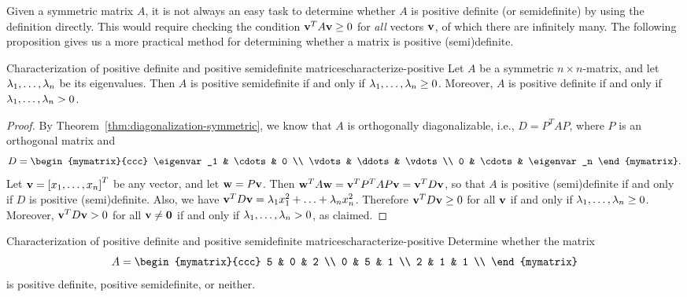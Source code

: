 Given a symmetric matrix $A$, it is not always an easy task to
determine whether $A$ is positive definite (or semidefinite) by using
the definition directly. This would require checking the condition
$\vect{v}^TA\vect{v}\geq 0$ for {\em all} vectors $\vect{v}$, of which
there are infinitely many. The following proposition gives us a more
practical method for determining whether a matrix is positive
(semi)definite.

\begin{proposition}{Characterization of positive definite and positive semidefinite matrices}{characterize-positive}
  Let $A$ be a symmetric $n\times n$-matrix, and let
  $\lambda_1,\ldots,\lambda_n$ be its eigenvalues. Then $A$ is
  positive semidefinite if and only if
  $\lambda_1,\ldots,\lambda_n\geq 0$. Moreover, $A$ is positive
  definite if and only if $\lambda_1,\ldots,\lambda_n>0$.
\end{proposition}

\begin{proof}
  By Theorem~\ref{thm:diagonalization-symmetric}, we know that $A$ is
  orthogonally diagonalizable, i.e., $D=P^TAP$, where $P$ is an
  orthogonal matrix and
  \begin{equation*}
    D = \begin{mymatrix}{ccc}
      \eigenvar_1 & \cdots & 0 \\
      \vdots & \ddots & \vdots \\
      0 & \cdots & \eigenvar_n
    \end{mymatrix}.
  \end{equation*}
  Let $\vect{v}=\mat{x_1,\ldots,x_n}^T$ be any vector, and let
  $\vect{w}=P\vect{v}$. Then
  $\vect{w}^TA\vect{w} = \vect{v}^TP^TAP\vect{v} =
  \vect{v}^TD\vect{v}$, so that $A$ is positive (semi)definite if and
  only if $D$ is positive (semi)definite. Also, we have
  $\vect{v}^TD\vect{v} = \eigenvar_1x_1^2 + \ldots +
  \eigenvar_nx_n^2$. Therefore $\vect{v}^TD\vect{v}\geq 0$ for all
  $\vect{v}$ if and only if $\lambda_1,\ldots,\lambda_n\geq
  0$. Moreover, $\vect{v}^TD\vect{v}>0$ for all
  $\vect{v}\neq \vect{0}$ if and only if
  $\lambda_1,\ldots,\lambda_n>0$, as claimed.
\end{proof}

\begin{example}{Characterization of positive definite and positive semidefinite matrices}{characterize-positive}
  Determine whether the matrix
  \begin{equation*}
    A = \begin{mymatrix}{ccc}
      5 & 0 & 2 \\
      0 & 5 & 1 \\
      2 & 1 & 1 \\
    \end{mymatrix}
  \end{equation*}
  is positive definite, positive semidefinite, or neither.
\end{example}

